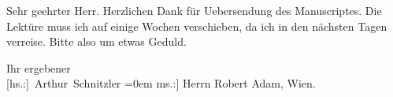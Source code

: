 \pstart\center{}Sehr geehrter Herr.\pend\vspace{0.5em}
\pstart
           Herzlichen Dank für Uebersendung des Manuscriptes. Die Lektüre muss ich auf einige Wochen
               verschieben, da ich in den nächsten Tagen verreise. Bitte also um etwas Geduld.\pend
           
\pstart
           Ihr ergebener{\\[\baselineskip]}\spacefill\mbox{{[}hs.:{]} Arthur Schnitzler}\pend
           \leftskip=0em{}
\pstart
           \noindent{}{[}ms.:{]} Herrn Robert Adam, Wien.\pend
           \endnumbering{}  \newcommand{\dateiname}{L01990}\newcommand{\titel}{Arthur Schnitzler an Robert Adam, 3. 12. 1910}\newcommand{\editorInnen}{Martin Anton Müller und Gerd-Hermann Susen}
